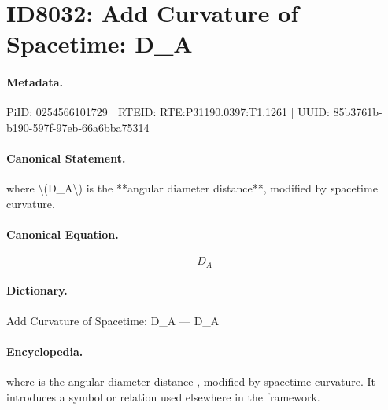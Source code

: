 \section*{ID8032: Add Curvature of Spacetime: D\_A}
\paragraph{Metadata.}
PiID: 0254566101729 | RTEID: RTE:P31190.0397:T1.1261 | UUID: 85b3761b-b190-597f-97eb-66a6bba75314

\paragraph{Canonical Statement.}
where \textbackslash{}(D\_A\textbackslash{}) is the **angular diameter distance**, modified by spacetime curvature.

\paragraph{Canonical Equation.}
\[
D_A
\]

\paragraph{Dictionary.}
Add Curvature of Spacetime: D\_A — D\_A

\paragraph{Encyclopedia.}
where is the angular diameter distance , modified by spacetime curvature. It introduces a symbol or relation used elsewhere in the framework.
